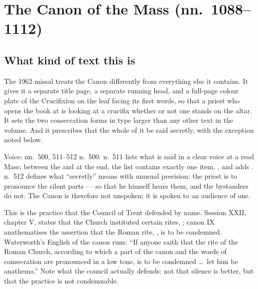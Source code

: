 \section{The Canon of the Mass (nn.~1088--1112)}

\subsection*{What kind of text this is}

The 1962 missal treats the Canon differently from everything else it contains.
It gives it a separate title page, a separate running head, and a full-page
colour plate of the Crucifixion on the leaf facing its first words, so that a
priest who opens the book at  is looking at a crucifix
whether or not one stands on the altar. It sets the two consecration forms in
type larger than any other text in the volume. And it prescribes that the whole
of it be said secretly, with the exception noted below.

\begin{rubricnote}{Voice:  nn.~500, 511--512}
n.~500:  n.~511 lists what is said in a clear voice at a read Mass;
between the  and  at
the end, the list contains exactly one item, , and adds . n.~512 defines what
``secretly'' means with unusual precision: the priest is to pronounce the
silent parts  --- so that he himself hears them, and the bystanders do not. The
Canon is therefore not unspoken; it is spoken to an audience of one.
\end{rubricnote}

This is the practice that the Council of Trent defended by name. Session XXII,
chapter V, states that the Church instituted certain rites, ;
canon IX anathematises the assertion that the Roman rite, , is to be
condemned. Waterworth's English of the canon runs: ``If anyone saith that the
rite of the Roman Church, according to which a part of the canon and the words
of consecration are pronounced in a low tone, is to be condemned \dots\ let him
be anathema.'' Note what the council actually defends: not that silence is
better, but that the practice is not condemnable.

